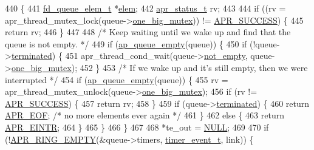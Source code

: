 \begin{DoxyCode}
440 \{
441     \hyperlink{structfd__queue__elem__t}{fd\_queue\_elem\_t} *\hyperlink{group__APR__Util__XML_gaf6c0c31c62555e73fa50b02e1393afc2}{elem};
442     \hyperlink{group__apr__errno_gaa5105fa83cc322f09382292db8b47593}{apr\_status\_t} rv;
443 
444     \textcolor{keywordflow}{if} ((rv = apr\_thread\_mutex\_lock(queue->\hyperlink{structfd__queue__t_af029904f6cc5ddc0afec5df2fadeaef6}{one\_big\_mutex})) != 
      \hyperlink{group__apr__errno_ga9ee311b7bf1c691dc521d721339ee2a6}{APR\_SUCCESS}) \{
445         \textcolor{keywordflow}{return} rv;
446     \}
447 
448     \textcolor{comment}{/* Keep waiting until we wake up and find that the queue is not empty. */}
449     \textcolor{keywordflow}{if} (\hyperlink{event_2fdqueue_8c_af337af05355304aefe574a0ec1739675}{ap\_queue\_empty}(queue)) \{
450         \textcolor{keywordflow}{if} (!queue->\hyperlink{structfd__queue__t_aace4fa4b984ffe25980fed75c97779d2}{terminated}) \{
451             apr\_thread\_cond\_wait(queue->\hyperlink{structfd__queue__t_a18ddd6a916b50d00310ee4ed096a562a}{not\_empty}, queue->\hyperlink{structfd__queue__t_af029904f6cc5ddc0afec5df2fadeaef6}{one\_big\_mutex});
452         \}
453         \textcolor{comment}{/* If we wake up and it's still empty, then we were interrupted */}
454         \textcolor{keywordflow}{if} (\hyperlink{event_2fdqueue_8c_af337af05355304aefe574a0ec1739675}{ap\_queue\_empty}(queue)) \{
455             rv = apr\_thread\_mutex\_unlock(queue->\hyperlink{structfd__queue__t_af029904f6cc5ddc0afec5df2fadeaef6}{one\_big\_mutex});
456             \textcolor{keywordflow}{if} (rv != \hyperlink{group__apr__errno_ga9ee311b7bf1c691dc521d721339ee2a6}{APR\_SUCCESS}) \{
457                 \textcolor{keywordflow}{return} rv;
458             \}
459             \textcolor{keywordflow}{if} (queue->\hyperlink{structfd__queue__t_aace4fa4b984ffe25980fed75c97779d2}{terminated}) \{
460                 \textcolor{keywordflow}{return} \hyperlink{group__APR__Error_ga35d9dca2514c522a2840aca0f3e2ebd3}{APR\_EOF}; \textcolor{comment}{/* no more elements ever again */}
461             \}
462             \textcolor{keywordflow}{else} \{
463                 \textcolor{keywordflow}{return} \hyperlink{group__APR__Error_gaee1ce306c0ebf1701b34172310aa1bd5}{APR\_EINTR};
464             \}
465         \}
466     \}
467 
468     *te\_out = \hyperlink{pcre_8txt_ad7f989d16aa8ca809a36bc392c07fba1}{NULL};
469 
470     \textcolor{keywordflow}{if} (!\hyperlink{group__apr__ring_ga9b64ad6eebea19f896d2aa90172b6b9a}{APR\_RING\_EMPTY}(&queue->timers, \hyperlink{structtimer__event__t}{timer\_event\_t}, link)) \{

\end{DoxyCode}
